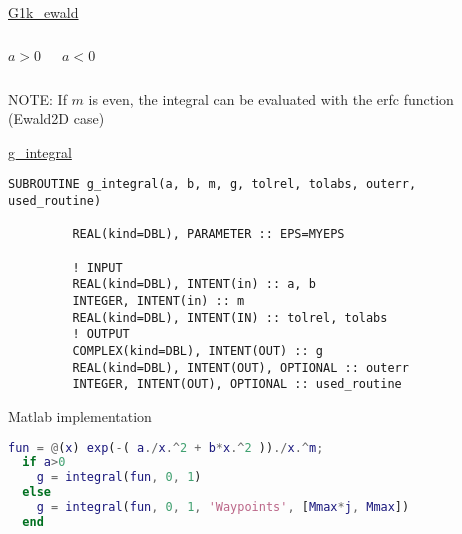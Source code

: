 \begin{frame}{\url{G1k_ewald}}
  \begin{columns}
    \begin{block}{\centering$a>0$}
    \end{block}
    \begin{block}{\centering$a<0$}
    \end{block}
  \end{columns}

  \vbss

  NOTE: If $m$ is even, the integral can be evaluated with the erfc function 
  (Ewald2D case)


\end{frame}


\begin{frame}{\url{g_integral}}
  
  \begin{lstlisting}[style=myFORTRANcodeS]
      SUBROUTINE g_integral(a, b, m, g, tolrel, tolabs, outerr, used_routine) 

         REAL(kind=DBL), PARAMETER :: EPS=MYEPS

         ! INPUT
         REAL(kind=DBL), INTENT(in) :: a, b
         INTEGER, INTENT(in) :: m
         REAL(kind=DBL), INTENT(IN) :: tolrel, tolabs
         ! OUTPUT
         COMPLEX(kind=DBL), INTENT(OUT) :: g
         REAL(kind=DBL), INTENT(OUT), OPTIONAL :: outerr
         INTEGER, INTENT(OUT), OPTIONAL :: used_routine
  \end{lstlisting}


  \begin{block}{Matlab implementation}
  \begin{lstlisting}[style=myFORTRANcodeS, language=Matlab]
  fun = @(x) exp(-( a./x.^2 + b*x.^2 ))./x.^m;
  if a>0
    g = integral(fun, 0, 1)
  else
    g = integral(fun, 0, 1, 'Waypoints', [Mmax*j, Mmax])
  end
  \end{lstlisting}
  \end{block}

\end{frame}

